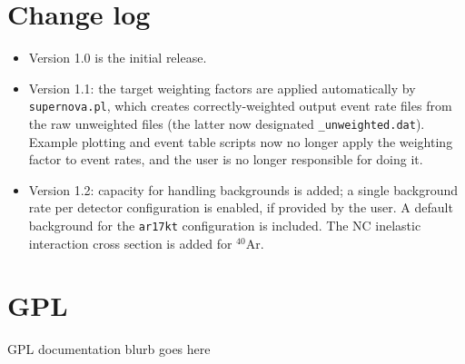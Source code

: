 \documentclass[12pt]{article}
\begin{document}
\appendix
\section{Change log}

\begin{itemize}
\item Version 1.0 is the initial release.
\item Version 1.1:  the target weighting factors are applied automatically by \texttt{supernova.pl}, which creates correctly-weighted output event rate files from the raw unweighted files (the latter now designated \texttt{\_unweighted.dat}).  Example plotting and event table scripts now no longer apply the weighting factor to event rates, and the user is no longer responsible for doing it.
\item Version 1.2: capacity for handling backgrounds is added; a single background rate per detector configuration is enabled, if provided by the user.  A default background for the \texttt{ar17kt} configuration is included. The NC inelastic interaction cross section is added for $^{40}$Ar.

 \end{itemize}


\section{GPL}

GPL documentation blurb goes here




\end{document}
